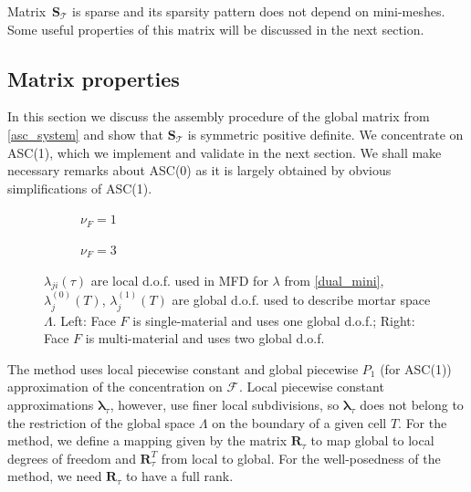 \documentclass[12pt]{article}
\newcommand{\svginputw}[2][\linewidth]{\def\svgwidth{#1}} %
\newcommand{\vect}[1]{\boldsymbol{\mathbf{#1}}}
\newcommand{\bmesh}{{\vect{\mathcal T}}}
\newcommand{\mmesh}{{\vect{\mathcal \tau}}}
\newcommand{\bfaces}[1][]{{\vect{\mathcal F}_{\text{#1}}}}
\begin{document}
	Matrix~$\vect S_\bmesh$ is sparse and its sparsity pattern does not depend on mini-meshes. Some useful properties of this matrix will be discussed in the next section.
	
	\subsection{Matrix properties}
	
	In this section we discuss the assembly procedure of the global matrix from \eqref{asc_system} and show that $\vect S_\bmesh$ is symmetric positive definite. We concentrate on ASC(1), which we implement and validate  in the next section. We shall make necessary remarks about ASC(0) as it is largely obtained by obvious simplifications of ASC(1).
	
	\begin{figure}[h]
		\centering		
		\begin{subfigure}{.45\linewidth}
			\centering
			\svginputw{e_plus_1.pdf_tex}
			\caption{$\nu_F = 1$}%
			\label{fig:asc_dofs:asc1:pc}
		\end{subfigure}%
		\qquad\quad
		\begin{subfigure}{.45\linewidth}
			\centering
			\svginputw{e_plus_2.pdf_tex}
			\caption{$\nu_F = 3$}		
		\end{subfigure}
		\caption{$\lambda_{ji}(\mmesh)$ are local d.o.f. used in MFD for $\lambda$ from \eqref{dual_mini}, $\lambda^{(0)}_j(T)$, $\lambda^{(1)}_j(T)$ are global d.o.f. used to describe mortar space $\Lambda$. Left: Face $F$ is single-material and uses one global d.o.f.; Right: Face $F$ is multi-material and uses two global d.o.f.
		\label{fig:asc_dofs:asc1:mmc}}
	\end{figure}
	
	The method uses local piecewise constant  and global piecewise $P_1$ \big(for ASC(1)\big) approximation of the concentration on $\bfaces$. Local piecewise constant approximations $\vect\lambda_\mmesh$, however, use finer local subdivisions, so $\vect\lambda_\mmesh$ does not belong to the restriction of the global space $\Lambda$ on the boundary of a given cell $T$. For the method, we define a mapping given by the matrix $\vect R_\mmesh$ to map global to local degrees of freedom and $\vect R_\mmesh^T$ from local   to global. For the well-posedness of the method, we need $\vect R_\mmesh$ to have a full rank.
	
\end{document}
